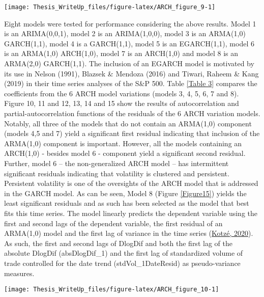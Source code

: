 \documentclass[11pt,preprint, authoryear]{elsarticle}
\let\origfigure\figure
\let\endorigfigure\endfigure
\renewenvironment{figure}[1][2] {
    \expandafter\origfigure\expandafter[H]
} {
    \endorigfigure
}
\numberwithin{equation}{section}
\numberwithin{figure}{section}
\numberwithin{table}{section}
\begin{document}
\begin{figure}[H]

{\centering \texttt{[image: Thesis\_WriteUp\_files/figure-latex/ARCH\_figure\_9-1]}

}

\caption{Autocorrelation and partial-autocorrelation functions of absolute LogDiff \label{Figure9}}\label{fig:ARCH_figure_9}
\end{figure}

Eight models were tested for performance considering the above results.
Model 1 is an ARIMA(0,0,1), model 2 is an ARIMA(1,0,0), model 3 is an
ARMA(1,0) GARCH(1,1), model 4 is a GARCH(1,1), model 5 is an
EGARCH(1,1), model 6 is an ARMA(1,0) ARCH(1,0), model 7 is an ARCH(1,0)
and model 8 is an ARMA(2,0) GARCH(1,1). The inclusion of an EGARCH model
is motivated by its use in Nelson (1991), Blazsek \& Mendoza (2016) and
Tiwari, Raheem \& Kang (2019) in their time series analyses of the S\&P
500. Table \ref{Table 3} compares the coefficients from the 6 ARCH model
variations (models 3, 4, 5, 6, 7 and 8). Figure 10, 11 and 12, 13, 14
and 15 show the results of autocorrelation and partial-autocorrelation
functions of the residuals of the 6 ARCH variation models. Notably, all
three of the models that do not contain an ARMA(1,0) component (models
4,5 and 7) yield a significant first residual indicating that inclusion
of the ARMA(1,0) component is important. However, all the models
containing an ARCH(1,0) - besides model 6 - component yield a
significant second residual. Further, model 6 -- the non-generalized
ARCH model -- has intermittent significant residuals indicating that
volatility is clustered and persistent. Persistent volatility is one of
the oversights of the ARCH model that is addressed in the GARCH model.
As can be seen, Model 8 (Figure \ref{Figure15}) yields the least
significant residuals and as such has been selected as the model that
best fits this time series. The model linearly predicts the dependent
variable using the first and second lags of the dependent variable, the
first residual of an ARMA(1,0) model and the first lag of variance in
the time series (\protect\hyperlink{ref-kotze2020univariate}{Kotzé,
2020}). As such, the first and second lags of DlogDif and both the first
lag of the absolute DlogDif (absDlogDif\_1) and the first lag of
standardized volume of trade controlled for the date trend
(stdVol\_1DateResid) as pseudo-variance measures.

\begin{figure}[H]

{\centering \texttt{[image: Thesis\_WriteUp\_files/figure-latex/ARCH\_figure\_10-1]}

}

\caption{Autocorrelation and partial-autocorrelation functions of model 3 - ARMA(1,0) GARCH(1,1) - residuals \label{Figure10}}\label{fig:ARCH_figure_10}
\end{figure}
\end{document}
